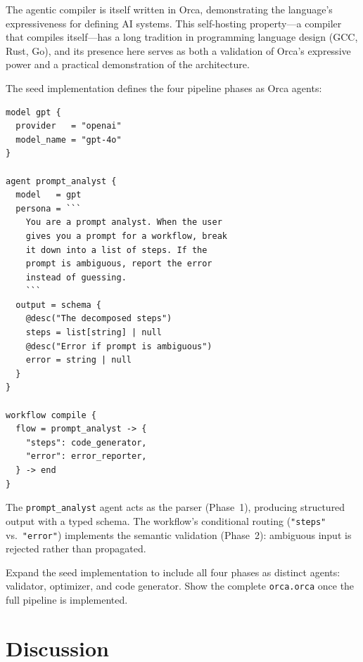 \documentclass[sigconf,nonacm]{acmart}
\begin{document}
The agentic compiler is itself written in Orca, demonstrating the
language's expressiveness for defining AI systems. This self-hosting
property---a compiler that compiles itself---has a long tradition in
programming language design (GCC, Rust, Go), and its presence here
serves as both a validation of Orca's expressive power and a practical
demonstration of the architecture.

The seed implementation defines the four pipeline phases as Orca agents:

\begin{lstlisting}[caption={Seed implementation of the agentic compiler
  in Orca (simplified). The prompt analyst decomposes natural language
  into structured steps.},label={fig:orca-compiler}]
model gpt {
  provider   = "openai"
  model_name = "gpt-4o"
}

agent prompt_analyst {
  model   = gpt
  persona = ```
    You are a prompt analyst. When the user
    gives you a prompt for a workflow, break
    it down into a list of steps. If the
    prompt is ambiguous, report the error
    instead of guessing.
    ```
  output = schema {
    @desc("The decomposed steps")
    steps = list[string] | null
    @desc("Error if prompt is ambiguous")
    error = string | null
  }
}

workflow compile {
  flow = prompt_analyst -> {
    "steps": code_generator,
    "error": error_reporter,
  } -> end
}
\end{lstlisting}

The \texttt{prompt\_analyst} agent acts as the parser (Phase~1),
producing structured output with a typed schema. The workflow's
conditional routing (\texttt{"steps"} vs.\ \texttt{"error"}) implements
the semantic validation (Phase~2): ambiguous input is rejected rather
than propagated.

\begin{todobox}
Expand the seed implementation to include all four phases as distinct
agents: validator, optimizer, and code generator. Show the complete
\texttt{orca.orca} once the full pipeline is implemented.
\end{todobox}

\section{Discussion}
\label{sec:discussion}
\end{document}
